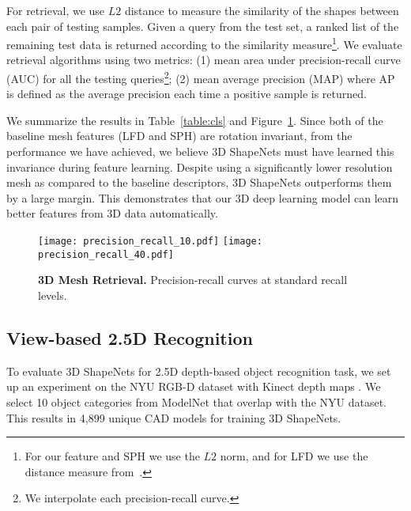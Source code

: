 \documentclass[10pt,twocolumn,letterpaper]{article}
\begin{document}
For retrieval, we use $L2$ distance to measure the similarity of the shapes between each pair of testing samples. Given a query from the test set, a ranked list of the remaining test data is returned according to the similarity measure\footnote{For our feature and SPH we use the $L2$ norm, and for LFD we use the distance measure from~\cite{LFDfeature}.}. We evaluate retrieval algorithms using two metrics: (1) mean area under precision-recall curve (AUC) for all the testing queries\footnote{We interpolate each precision-recall curve.}; (2) mean average precision (MAP) where AP is defined as the average precision each time a positive sample is returned. 

We summarize the results in Table~\ref{table:cls} and Figure~\ref{fig:feature}. 
Since both of the baseline mesh features (LFD and SPH) are rotation invariant, from the performance we have achieved, we believe 3D ShapeNets must have learned this invariance during feature learning. Despite using a significantly lower resolution mesh as compared to the baseline descriptors, 3D ShapeNets outperforms them by a large margin. 
This demonstrates that our 3D deep learning model can learn better features from 3D data automatically.



\begin{figure}[t]
\centering
\texttt{[image: precision\_recall\_10.pdf]} \quad
\texttt{[image: precision\_recall\_40.pdf]}




\vspace{-2mm}
\caption{{\bf 3D Mesh Retrieval.} Precision-recall curves at standard recall levels.}
\label{fig:feature}
\end{figure}

\subsection{View-based 2.5D Recognition}




To evaluate 3D ShapeNets for 2.5D depth-based object recognition task, 
we set up an experiment on the NYU RGB-D dataset with Kinect depth maps \cite{NYUdataset}.
We select 10 object categories from ModelNet that overlap with the NYU dataset. This results in 4,899 unique CAD models for training 3D ShapeNets. 
\end{document}
